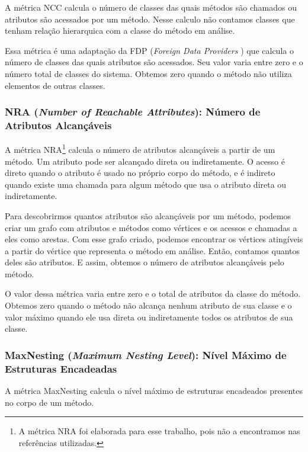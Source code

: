 A métrica NCC calcula o número de classes das quais métodos são chamados ou atributos são acessados por um método. Nesse calculo não contamos classes que tenham relação hierarquica  com a classe do método em análise.

Essa métrica é uma adaptação da FDP (\textit{Foreign Data Providers} \citep{Lanza06}) que calcula o número de classes das quais atributos são acessados. Seu valor varia entre zero e o número total de classes do sistema. Obtemos zero quando o método não utiliza elementos de outras classes.
                                                                 

\subsubsection{NRA (\textit{Number of Reachable Attributes}): Número de Atributos Alcançáveis}

A métrica NRA\footnote{A métrica NRA foi elaborada para esse trabalho, pois não a encontramos nas referências utilizadas.} calcula o número de atributos alcançáveis a partir de um método. Um atributo pode ser alcançado direta ou indiretamente. O acesso é direto quando o atributo é usado no próprio corpo do método, e é indireto quando existe uma chamada para algum método que usa o atributo direta ou indiretamente.
 	          
Para descobrirmos quantos atributos são alcançáveis por um método, podemos criar um grafo com atributos e métodos como vértices e os acessos e chamadas a eles como arestas. Com esse grafo criado, podemos encontrar os vértices atingíveis a partir do vértice que representa o método em análise. Então, contamos quantos deles são atributos. E assim, obtemos o número de atributos alcançáveis pelo método.

O valor dessa métrica varia entre zero e o total de atributos da classe do método. Obtemos zero quando o método não alcança nenhum atributo de sua classe e o valor máximo quando ele usa direta ou indiretamente todos os atributos de sua classe.


\subsubsection{MaxNesting (\textit{Maximum Nesting Level}): Nível Máximo de Estruturas Encadeadas}

A métrica MaxNesting \citep{Lanza06} calcula o nível máximo de estruturas encadeados presentes no corpo de um método.

